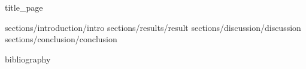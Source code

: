 \documentclass[oneside,openright,titlepage,numbers=noenddot,headinclude,
               footinclude=true,cleardoublepage=empty,
               BCOR=5mm,paper=a4,fontsize=11pt]{article}
\begin{document}
\frenchspacing
\raggedbottom
\pagestyle{empty}
\pagestyle{plain}


 {title_page}

 {sections/introduction/intro}
 {sections/results/result}
 {sections/discussion/discussion}
 {sections/conclusion/conclusion}




\newpage

 {bibliography}
\end{document}
